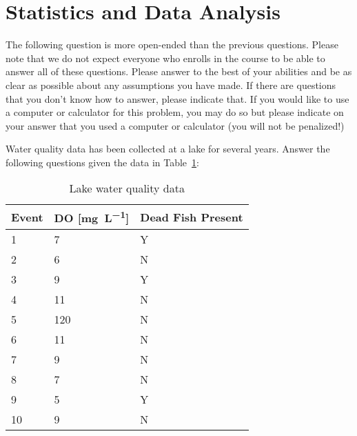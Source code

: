 \documentclass[paper=letter, fontsize=11pt]{scrartcl}
\numberwithin{equation}{section}
\numberwithin{figure}{section}
\numberwithin{table}{section}
\begin{document}
\section{Statistics and Data Analysis}

The following question is more open-ended than the previous questions.
Please note that we do not expect everyone who enrolls in the course to be able to answer all of these questions.
Please answer to the best of your abilities and be as clear as possible about any assumptions you have made.
If there are questions that you don't know how to answer, please indicate that.
If you would like to use a computer or calculator for this problem, you  may do so but please indicate on your answer that you used a computer or calculator (you will not be penalized!)

Water quality data has been collected at a lake for several years.
Answer the following questions given the data in Table~\ref{tab:lake-data}:
\begin{table}[h]
  \centering
  \begin{tabular}{l l l}
    \toprule
    Event & DO [\si{\milli\gram\per\liter}] & Dead Fish Present \\
    \midrule
    1 & 7 & Y \\
    2 & 6 & N \\
    3 & 9 & Y \\
    4 & 11 & N \\
    5 & 120 & N \\
    6 & 11 & N \\
    7 & 9 & N \\
    8 & 7 & N \\
    9 & 5 & Y \\
    10 & 9 & N \\
    \bottomrule
  \end{tabular}
  \caption{Lake water quality data \label{tab:lake-data}}
\end{table}
\end{document}
